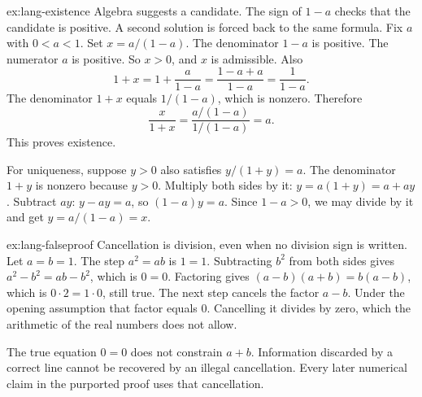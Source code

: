 \begin{solution}{ex:lang-existence}
\idea Algebra suggests a candidate. The sign of $1-a$ checks that the candidate is positive. A second solution is forced back to the same formula.
\writeup Fix $a$ with $0<a<1$. Set $x=a/(1-a)$. The denominator $1-a$ is positive. The numerator $a$ is positive. So $x>0$, and $x$ is admissible. Also
\[
1+x=1+\frac{a}{1-a}=\frac{1-a+a}{1-a}=\frac{1}{1-a}.
\]
The denominator $1+x$ equals $1/(1-a)$, which is nonzero. Therefore
\[
\frac{x}{1+x}=\frac{a/(1-a)}{1/(1-a)}=a.
\]
This proves existence.

For uniqueness, suppose $y>0$ also satisfies $y/(1+y)=a$. The denominator $1+y$ is nonzero because $y>0$. Multiply both sides by it: $y=a(1+y)=a+ay$. Subtract $ay$: $y-ay=a$, so $(1-a)y=a$. Since $1-a>0$, we may divide by it and get $y=a/(1-a)=x$.
\end{solution}

\begin{solution}{ex:lang-falseproof}
\idea Cancellation is division, even when no division sign is written.
\writeup Let $a=b=1$. The step $a^2=ab$ is $1=1$. Subtracting $b^2$ from both sides gives $a^2-b^2=ab-b^2$, which is $0=0$. Factoring gives $(a-b)(a+b)=b(a-b)$, which is $0\cdot 2=1\cdot 0$, still true. The next step cancels the factor $a-b$. Under the opening assumption that factor equals $0$. Cancelling it divides by zero, which the arithmetic of the real numbers does not allow.

The true equation $0=0$ does not constrain $a+b$. Information discarded by a correct line cannot be recovered by an illegal cancellation. Every later numerical claim in the purported proof uses that cancellation.
\end{solution}

